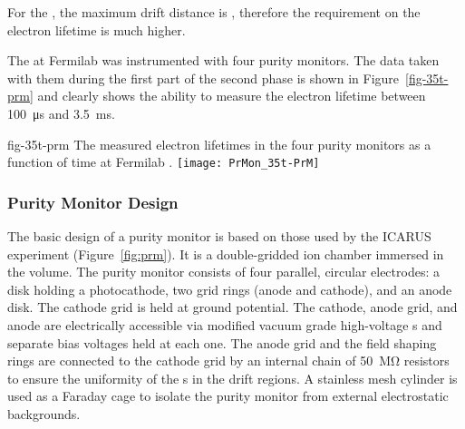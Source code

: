 For the , the maximum drift distance is \dpmaxdrift{}, therefore the requirement on the electron lifetime is much higher.


The %
 at Fermilab was instrumented with four purity monitors. The data taken with them during the first part of the second phase is shown in Figure~\ref{fig-35t-prm} and clearly shows the ability to measure the electron lifetime between \SI{100}{\micro\second} and \SI{3.5}{\milli\second}.  

\begin{dunefigure}{fig-35t-prm}
  {The measured electron lifetimes in the four purity monitors as a function of time at Fermilab .}
  \texttt{[image: PrMon\_35t-PrM]}%
\end{dunefigure}


\subsubsection{Purity Monitor Design}

The basic design of a purity monitor is based on those used by the ICARUS experiment (Figure~\ref{fig:prm})\cite{Adamowski:2014daa}. It is a double-gridded ion chamber immersed in the \lar volume.   The purity monitor consists of four parallel, circular electrodes: a disk holding a photocathode, two grid rings (anode and cathode), and an anode disk. The cathode grid is held at ground potential. The cathode, anode grid, and anode are electrically accessible via modified vacuum grade high-voltage \fdth{}s and separate bias voltages held at each one.  
The anode grid and the field shaping rings are connected to the cathode grid by an internal chain of \SI{50}{\mega\ohm} resistors to ensure the uniformity of the \efield{}s in the drift regions. A stainless mesh cylinder is used as a Faraday cage to isolate the purity monitor from external electrostatic backgrounds. 

